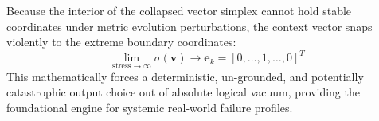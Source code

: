 \documentclass{article}
\begin{document}
Because the interior of the collapsed vector simplex cannot hold stable coordinates under metric evolution perturbations, the context vector snaps violently to the extreme boundary coordinates:
\begin{equation}
    \lim_{\text{stress} \to \infty} \sigma(\bm{v}) \to \bm{e}_k = [0, \dots, 1, \dots, 0]^T
\end{equation}
This mathematically forces a deterministic, un-grounded, and potentially catastrophic output choice out of absolute logical vacuum, providing the foundational engine for systemic real-world failure profiles.
\end{document}
